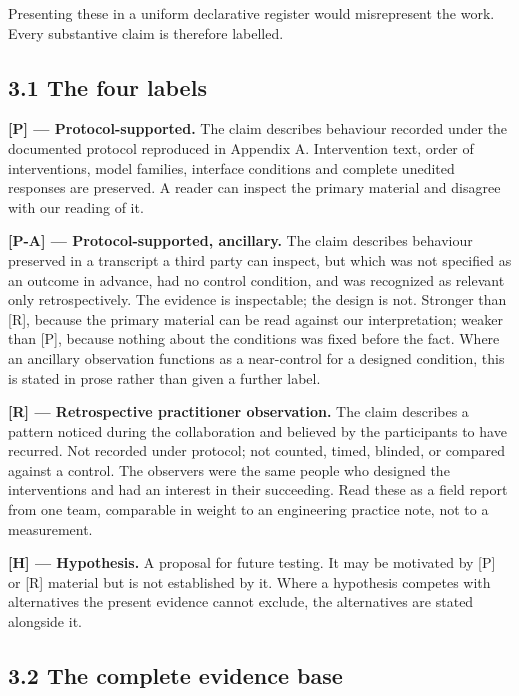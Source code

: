 Presenting these in a uniform declarative register would misrepresent the work. Every substantive claim is therefore labelled.


\subsection*{3.1 The four labels}
\label{sec:en:3.1}

\textbf{[P] — Protocol-supported.} The claim describes behaviour recorded under the documented protocol reproduced in Appendix A. Intervention text, order of interventions, model families, interface conditions and complete unedited responses are preserved. A reader can inspect the primary material and disagree with our reading of it.

\textbf{[P-A] — Protocol-supported, ancillary.} The claim describes behaviour preserved in a transcript a third party can inspect, but which was not specified as an outcome in advance, had no control condition, and was recognized as relevant only retrospectively. The evidence is inspectable; the design is not. Stronger than [R], because the primary material can be read against our interpretation; weaker than [P], because nothing about the conditions was fixed before the fact. Where an ancillary observation functions as a near-control for a designed condition, this is stated in prose rather than given a further label.

\textbf{[R] — Retrospective practitioner observation.} The claim describes a pattern noticed during the collaboration and believed by the participants to have recurred. Not recorded under protocol; not counted, timed, blinded, or compared against a control. The observers were the same people who designed the interventions and had an interest in their succeeding. Read these as a field report from one team, comparable in weight to an engineering practice note, not to a measurement.

\textbf{[H] — Hypothesis.} A proposal for future testing. It may be motivated by [P] or [R] material but is not established by it. Where a hypothesis competes with alternatives the present evidence cannot exclude, the alternatives are stated alongside it.


\subsection*{3.2 The complete evidence base}
\label{sec:en:3.2}

